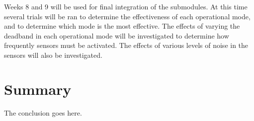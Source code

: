 \documentclass[journal, 10pt]{IEEEtran}
\begin{document}
Weeks 8 and 9 will be used for final integration of the submodules. At this time several trials will be ran to determine the effectiveness of each operational mode, and to determine which mode is the most effective. The effects of varying the deadband in each operational mode will be investigated to determine how frequently sensors must be activated. The effects of various levels of noise in the sensors will also be investigated.

%


\section{Summary}
The conclusion goes here.



\nocite{*}

{}
\end{document}
